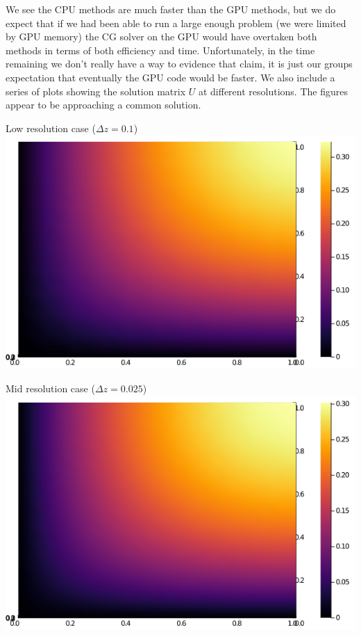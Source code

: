 \documentclass[11pt]{article}
\begin{document}
	We see the CPU methods are much faster than the GPU methods, but we do expect that if we had been able to run a large enough problem (we were limited by GPU memory) the CG solver on the GPU would have overtaken both methods in terms of both efficiency and time. Unfortunately, in the time remaining we don't really have a way to evidence that claim, it is just our groups expectation that eventually the GPU code would be faster.
	\newline\indent
	We also include a series of plots showing the solution matrix $ U $ at different resolutions. The figures appear to be approaching a common solution.
	\begin{center}
		Low resolution case ($ \Delta z = 0.1 $)
		\includegraphics[scale=0.5]{2D_low_res.png}
	\end{center}
	\begin{center}
		Mid resolution case ($ \Delta z = 0.025 $)
		\includegraphics[scale=0.5]{2D_mid_res.png}
	\end{center}
\end{document}
